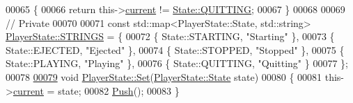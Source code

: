 \begin{DoxyCode}
00065 \textcolor{keyword}{}\{
00066     \textcolor{keywordflow}{return} this->\hyperlink{classPlayerState_add16beba271881c0e1e40430b80f5bd6}{current} != \hyperlink{classPlayerState_ab013f68ff23d69d677faae624b5dff07a4eb3979af877a3c13830cd69c746e230}{State::QUITTING};
00067 \}
00068 
00069 \textcolor{comment}{// Private}
00070 
00071 \textcolor{keyword}{const} std::map<PlayerState::State, std::string> \hyperlink{classPlayerState_af9cd9cd0e2d4c24e59ea11d35bdaff78}{PlayerState::STRINGS} = \{
00072     \{ State::STARTING, \textcolor{stringliteral}{"Starting"} \},
00073     \{ State::EJECTED, \textcolor{stringliteral}{"Ejected"} \},
00074     \{ State::STOPPED, \textcolor{stringliteral}{"Stopped"} \},
00075     \{ State::PLAYING, \textcolor{stringliteral}{"Playing"} \},
00076     \{ State::QUITTING, \textcolor{stringliteral}{"Quitting"} \}
00077 \};
00078 
\hypertarget{player__state_8cpp_source_l00079}{}\hyperlink{classPlayerState_a822999cf7d4cf72ba77f218906bb8aaa}{00079} \textcolor{keywordtype}{void} \hyperlink{classPlayerState_a822999cf7d4cf72ba77f218906bb8aaa}{PlayerState::Set}(\hyperlink{classPlayerState_ab013f68ff23d69d677faae624b5dff07}{PlayerState::State} state)
00080 \{
00081     this->\hyperlink{classPlayerState_add16beba271881c0e1e40430b80f5bd6}{current} = state;
00082     \hyperlink{classResponseSource_a6e3b93326ee043f6d60510acd08de69b}{Push}();
00083 \}
\end{DoxyCode}
